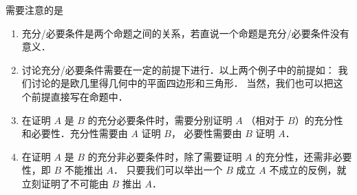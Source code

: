 需要注意的是 
\begin{enumerate}
\item 充分/必要条件是两个命题之间的关系，若直说一个命题是充分/必要条件没有意义．
\item 讨论充分/必要条件需要在一定的前提下进行．以上两个例子中的前提如： 我们讨论的是欧几里得几何中的平面四边形和三角形． 当然，我们也可以把这个前提直接写在命题中．
\item 在证明 $A$ 是 $B$ 的充分必要条件时，需要分别证明 $A$ （相对于 $B$）的充分性和必要性．充分性需要由 $A$ 证明 $B$， 必要性需要由 $B$ 证明 $A$． 
\item 在证明 $A$ 是 $B$ 的充分非必要条件时，除了需要证明 $A$ 的充分性，还需非必要性，即 $B$ 不能推出 $A$． 只要我们可以举出一个 $B$ 成立 $A$ 不成立的反例，就立刻证明了不可能由 $B$ 推出 $A$． 
\end{enumerate}
